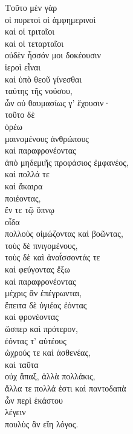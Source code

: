 {\large
\begin{greek}
\noindent Τοῦτο μὲν γὰρ \\
οἱ πυρετοὶ οἱ ἀμφημερινοὶ \\
\tabto{2em} καὶ οἱ τριταῖοι \\
\tabto{2em} καὶ οἱ τεταρταῖοι \\
οὐδὲν ἧσσόν μοι δοκέουσιν \\
\tabto{2em} ἱεροὶ εἶναι \\
καὶ ὑπὸ θεοῦ γίνεσθαι \\
\tabto{2em} ταύτης τῆς νούσου, \\
ὧν οὐ θαυμασίως γ' ἔχουσιν· \\
τοῦτο δὲ \\
ὁρέω \\
μαινομένους ἀνθρώπους \\
καὶ παραφρονέοντας \\
\tabto{2em} ἀπὸ μηδεμιῆς προφάσιος ἐμφανέος, \\

καὶ πολλά τε \\
καὶ ἄκαιρα \\
\tabto{2em} ποιέοντας, \\
ἔν τε τῷ ὕπνῳ \\
οἶδα \\
\tabto{2em} πολλοὺς οἰμώζοντας καὶ βοῶντας, \\
\tabto{2em} τοὺς δὲ πνιγομένους, \\
\tabto{2em} τοὺς δὲ καὶ ἀναΐσσοντάς τε\\
\tabto{2em} καὶ φεύγοντας ἔξω \\
\tabto{2em} καὶ παραφρονέοντας \\
\tabto{2em} \tabto{2em} μέχρις ἂν ἐπέγρωνται, \\
ἔπειτα δὲ ὑγιέας ἐόντας \\
καὶ φρονέοντας \\
\tabto{2em} ὥσπερ καὶ πρότερον, \\
ἐόντας τ' αὐτέους \\
\tabto{2em} ὠχρούς τε καὶ ἀσθενέας, \\
καὶ ταῦτα \\
\tabto{2em} οὐχ ἅπαξ, ἀλλὰ πολλάκις,\\
ἄλλα τε πολλά ἐστι καὶ παντοδαπὰ\\
\tabto{2em} ὧν περὶ ἑκάστου \\
\tabto{2em} \tabto{2em} λέγειν \\
\tabto{2em} \tabto{2em} πουλὺς ἂν εἴη λόγος.\\

\end{greek}
}

